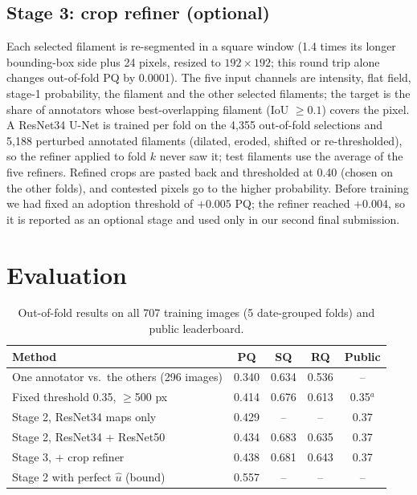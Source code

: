 \documentclass[sigconf]{acmart}
\begin{document}
\subsection{Stage 3: crop refiner (optional)}
Each selected filament is re-segmented in a square window (1.4 times its longer bounding-box side plus 24 pixels, resized to $192\times192$; this round trip alone changes out-of-fold PQ by 0.0001). The five input channels are intensity, flat field, stage-1 probability, the filament and the other selected filaments; the target is the share of annotators whose best-overlapping filament (IoU $\ge 0.1$) covers the pixel. A ResNet34 U-Net is trained per fold on the 4,355 out-of-fold selections and 5,188 perturbed annotated filaments (dilated, eroded, shifted or re-thresholded), so the refiner applied to fold $k$ never saw it; test filaments use the average of the five refiners. Refined crops are pasted back and thresholded at 0.40 (chosen on the other folds), and contested pixels go to the higher probability. Before training we had fixed an adoption threshold of $+0.005$ PQ; the refiner reached $+0.004$, so it is reported as an optional stage and used only in our second final submission.

\section{Evaluation}\label{sec:evaluation}
\begin{table}[t]
\caption{Out-of-fold results on all 707 training images (5 date-grouped folds) and public leaderboard.}\label{tab:results}
\small
\begin{tabular}{lcccc}
\toprule
Method & PQ & SQ & RQ & Public \\
\midrule
One annotator vs.\ the others (296 images) & 0.340 & 0.634 & 0.536 & -- \\
Fixed threshold 0.35, $\ge$500 px & 0.414 & 0.676 & 0.613 & 0.35$^a$ \\
Stage 2, ResNet34 maps only & 0.429 & -- & -- & 0.37 \\
Stage 2, ResNet34 + ResNet50 & 0.434 & 0.683 & 0.635 & 0.37 \\
Stage 3, + crop refiner & 0.438 & 0.681 & 0.643 & 0.37 \\
\midrule
Stage 2 with perfect $\hat u$ (bound) & 0.557 & -- & -- & -- \\
\bottomrule
\end{tabular}
\par{}
\end{table}
\end{document}
